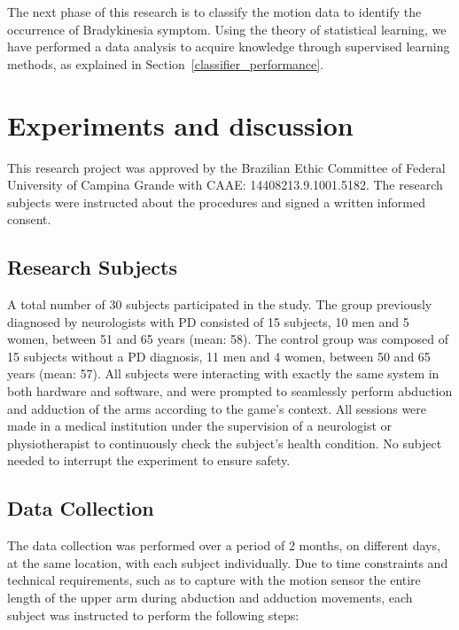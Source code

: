 \documentclass[10pt, conference, compsocconf]{IEEEtran}
\begin{document}
The next phase of this research is to classify the motion data to identify the occurrence of Bradykinesia symptom. Using the theory of statistical learning, we have performed a data analysis to acquire knowledge through supervised learning methods, as explained in Section~\ref{classifier_performance}.

\section{Experiments and discussion}
\label{sec:experimentalresults}

This research project was approved by the Brazilian Ethic Committee of Federal University of Campina Grande with CAAE: 14408213.9.1001.5182. The research subjects were instructed about the procedures and signed a written informed consent.

\subsection{Research Subjects}

A total number of 30 subjects participated in the study. The group previously diagnosed by neurologists with PD consisted of 15 subjects, 10 men and 5 women, between 51 and 65 years (mean: 58). The control group was composed of 15 subjects without a PD diagnosis, 11 men and 4 women, between 50 and 65 years (mean: 57). All subjects were interacting with exactly the same system in both hardware and software, and were prompted to seamlessly perform abduction and adduction of the arms according to the game's context. All sessions were made in a medical institution under the supervision of a neurologist or physiotherapist to continuously check the subject's health condition. No subject needed to interrupt the experiment to ensure safety.

\subsection{Data Collection}

The data collection was performed over a period of 2 months, on different days, at the same location, with each subject individually. Due to time constraints and technical requirements, such as to capture with the motion sensor the entire length of the upper arm during abduction and adduction movements, each subject was instructed to perform the following steps:
\end{document}
